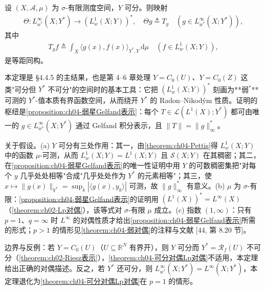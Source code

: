 \documentclass[../../main.tex]{subfiles}%
\begin{document}
\begin{theorem}\label{theorem:ch04-可分Y对偶}
设 $(X,\mathcal{A},\mu)$ 为 $\sigma$-有限测度空间，$Y$ 可分。则映射
\begin{align}
\Theta:L^\infty_{w^*}(X;Y^*)\to(L^1_w(X;Y))^*,\quad \Theta g\triangleq T_g\quad(g\in L^\infty_{w^*}(X;Y^*)), \label{align:ch04-4.109a}
\end{align}
其中
\begin{align}
T_gf\triangleq\int_X\langle g(x),f(x)\rangle_{Y^*,Y}\,\mathrm{d}\mu\quad(f\in L^1_w(X;Y)), \label{align:ch04-4.109b}
\end{align}
是等距同构。
\end{theorem}

\begin{remark}\label{remark:ch04-可分Y对偶}
本定理是 §4.4.5 的主结果，也是第 4--6 章处理 $Y=C_0(U)$、$Y=C_0(Z)$ 这类"可分但 $Y^*$ 不可分"的空间时的基本工具：它把 $(L^1_w(X;Y))^*$ 刻画为**弱$^*$**可测的 $Y^*$-值本质有界函数空间，从而绕开 $Y^*$ 的 Radon--Nikodým 性质。证明的枢纽是\cref{proposition:ch04-弱星Gelfand表示}：每个 $T\in\mathcal{L}(L^1(X);Y^*)$ 都可由唯一的 $g\in L^\infty_{w^*}(X;Y^*)$ 通过 Gelfand 积分表示，且 $\|T\|=\|g\|_\infty^*$。

关于假设。(a) $Y$ 可分有三处作用：其一，由\cref{theorem:ch04-Pettis}得 $L^1_w(X;Y)$ 中的函数 $\mu$-可测，从而 $L^1_w(X;Y)=L^1(X;Y)$ 且 $\mathcal{S}(X;Y)$ 在其稠密；其二，在\cref{proposition:ch04-弱星Gelfand表示}的唯一性证明中用 $Y$ 的可数稠密集把"对每个 $y$ 几乎处处相等"合成"几乎处处作为 $Y^*$ 的元素相等"；其三，使 $x\mapsto\|g(x)\|_{Y^*}=\sup_k|\langle g(x),y_k\rangle|$ 可测，故 $\|g\|_\infty^*$ 有意义。(b) $\mu$ 为 $\sigma$-有限：\cref{proposition:ch04-弱星Gelfand表示}的证明用 $(L^1(X))^*=L^\infty(X)$（\cref{theorem:ch02-Lp对偶}），该等式对 $\sigma$-有限 $\mu$ 成立。(c) 指数 $(1,\infty)$：只有 $p=1$、$q=\infty$ 时 $L^\infty$ 的对偶性质才给出\cref{proposition:ch04-弱星Gelfand表示}所需的形式；$p>1$ 的情形见\cref{theorem:ch04-弱对偶}的注释与文献 [44, 第 8.20 节]。

边界与反例：若 $Y=C_0(U)$（$U\subseteq\mathbb{R}^N$ 有界开），则 $Y$ 可分而 $Y^*=\mathscr{R}_f(U)$ 不可分（\cref{theorem:ch02-Riesz表示}），\cref{theorem:ch04-可分对偶Lp对偶}不适用，本定理给出正确的对偶描述。反之，若 $Y^*$ 还可分，则 $L^\infty_{w^*}(X;Y^*)=L^\infty(X;Y^*)$，本定理退化为\cref{theorem:ch04-可分对偶Lp对偶}在 $p=1$ 的情形。
\end{remark}
\end{document}
